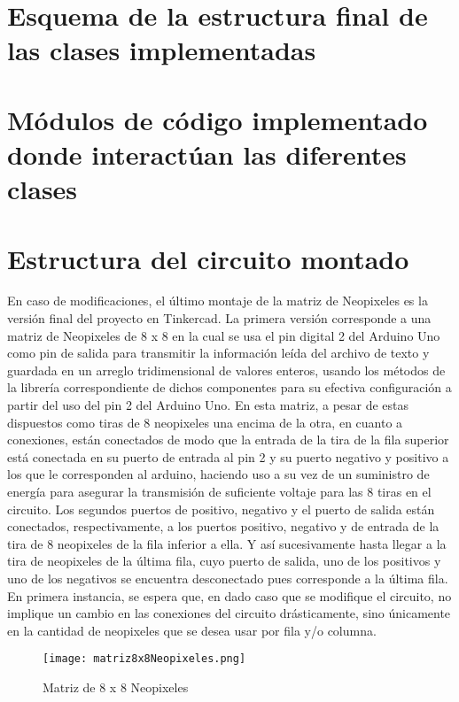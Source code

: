 \documentclass{article}
\begin{document}
\section{Esquema de la estructura final de las clases implementadas}
\section{Módulos de código implementado donde interactúan las diferentes clases}
\section{Estructura del circuito montado}
En caso de modificaciones, el último montaje de la matriz de Neopixeles es la versión final del proyecto en Tinkercad. La primera versión corresponde a una matriz de Neopixeles de 8 x 8 en la cual se usa el pin digital 2 del Arduino Uno como pin de salida para transmitir la información leída del archivo de texto y guardada en un arreglo tridimensional de valores enteros, usando los métodos de la librería correspondiente de dichos componentes para su efectiva configuración a partir del uso del pin 2 del Arduino Uno. En esta matriz, a pesar de estas dispuestos como tiras de 8 neopixeles una encima de la otra, en cuanto a conexiones, están conectados de modo que la entrada de la tira de la fila superior está conectada en su puerto de entrada al pin 2 y su puerto negativo y positivo a los que le corresponden al arduino, haciendo uso a su vez de un suministro de energía para asegurar la transmisión de suficiente voltaje para las 8 tiras en el circuito. Los segundos puertos de positivo, negativo y el puerto de salida están conectados, respectivamente, a los puertos positivo, negativo y de entrada de la tira de 8 neopixeles de la fila inferior a ella. Y así sucesivamente hasta llegar a la tira de neopixeles de la última fila, cuyo puerto de salida, uno de los positivos y uno de los negativos se encuentra desconectado pues corresponde a la última fila. En primera instancia, se espera que, en dado caso que se modifique el circuito, no implique un cambio en las conexiones del circuito drásticamente, sino únicamente en la cantidad de neopixeles que se desea usar por fila y/o columna.
\begin{figure} 
    \centering
    \texttt{[image: matriz8x8Neopixeles.png]}
    \caption{Matriz de 8 x 8 Neopixeles}
    \label{fig:mat8x8_neo}
\end{figure}
\end{document}
